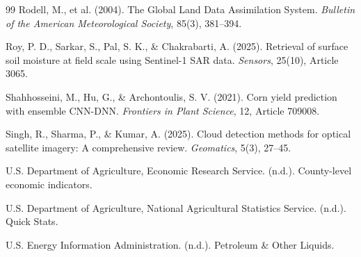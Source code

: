 \documentclass[twocolumn]{article}
\begin{document}
\begin{thebibliography}{99}
 Rodell, M., et al. (2004). The Global Land Data Assimilation System. \textit{Bulletin of the American Meteorological Society}, 85(3), 381--394.

 Roy, P. D., Sarkar, S., Pal, S. K., \& Chakrabarti, A. (2025). Retrieval of surface soil moisture at field scale using Sentinel-1 SAR data. \textit{Sensors}, 25(10), Article 3065.

 Shahhosseini, M., Hu, G., \& Archontoulis, S. V. (2021). Corn yield prediction with ensemble CNN-DNN. \textit{Frontiers in Plant Science}, 12, Article 709008.

 Singh, R., Sharma, P., \& Kumar, A. (2025). Cloud detection methods for optical satellite imagery: A comprehensive review. \textit{Geomatics}, 5(3), 27--45.

 U.S. Department of Agriculture, Economic Research Service. (n.d.). County-level economic indicators.

 U.S. Department of Agriculture, National Agricultural Statistics Service. (n.d.). Quick Stats.

 U.S. Energy Information Administration. (n.d.). Petroleum \& Other Liquids.

\end{thebibliography}
\end{document}
